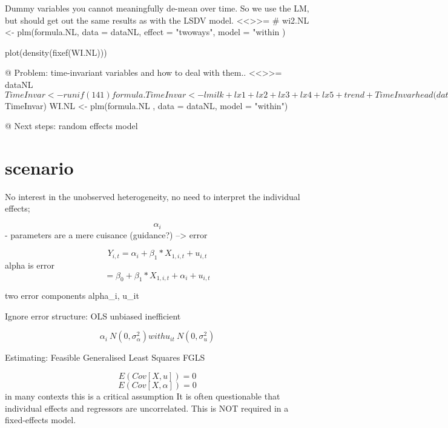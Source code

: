 \documentclass{article}
\begin{document}
              Dummy variables you cannot meaningfully de-mean over time. So we use the LM, but should get out the same                results as with the LSDV model.
              <<>>=
              # wi2.NL <- plm(formula.NL, data = dataNL, effect = "twoways", model = "within )
              
              
              plot(density(fixef(WI.NL)))
              
              @
          Problem: time-invariant variables and how to deal with them..
              <<>>=
              dataNL$TimeInvar <- runif(141) %
              formula.TimeInvar <- lmilk + lx1 + lx2 + lx3 + lx4 + lx5 + trend + TimeInvar
              
              
              head(dataNL$TimeInvar)  
                WI.NL <- plm(formula.NL , data = dataNL, model = "within")
                
                @
                Next steps: random effects model
                
                \section{scenario}
                
                No interest in the unobserved heterogeneity, no need to interpret the individual effects;
                 
                  \[ \alpha_i \] - parameters are a mere cuisance (guidance?) --> error
                  
                  \[ Y_{i,t} = \alpha_i + \beta_1*X_{1,i,t} + u_{i,t} \]
                  alpha is error 
                  \[ = \beta_0 + \beta_1*X_{1,i,t} + \alpha_i +  u_{i,t} \]
                  
                  two error components alpha_i, u_it
                  
                  Ignore error structure: OLS \rightarrow unbiased
                                              \rightarrow inefficient
                  
                  \[ \alpha_i ~ N(0, \sigma_\alpha^2)  with u_{it} ~ N(0, \sigma_u^2)\]
                  
                  Estimating: Feasible Generalised Least Squares FGLS
                  
                 \[ E(Cov[X, u]) = 0 \]
                 \[ E(Cov[X, \alpha]) = 0 \] \leftarrow in many contexts this is a critical assumption
                 It is often questionable that individual effects and regressors are uncorrelated.
                 This is NOT required in a fixed-effects model. 
                 
\end{document}
